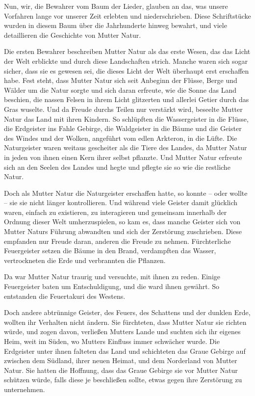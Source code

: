\trennzeichen

Nun, wir, die Bewahrer vom Baum der Lieder, glauben an das, was unsere Vorfahren lange vor unserer Zeit erlebten und niederschrieben. Diese Schriftstücke wurden in diesem Baum über die Jahrhunderte hinweg bewahrt, und viele detaillieren die Geschichte von Mutter Natur.

Die ersten Bewahrer beschreiben Mutter Natur als das erste Wesen, das das Licht der Welt erblickte und durch diese Landschaften strich. Manche waren sich sogar sicher, dass sie es gewesen sei, die dieses Licht der Welt überhaupt erst erschaffen habe. Fest steht, dass Mutter Natur sich seit Anbeginn der Flüsse, Berge und Wälder um die Natur sorgte und sich daran erfreute, wie die Sonne das Land beschien, die nassen Felsen in ihrem Licht glitzerten und allerlei Getier durch das Gras wuselte. Und da Freude durchs Teilen nur verstärkt wird, beseelte Mutter Natur das Land mit ihren Kindern. So schlüpften die Wassergeister in die Flüsse, die Erdgeister ins Fahle Gebirge, die Waldgeister in die Bäume und die Geister des Windes und der Wolken, angeführt vom edlen Arkteron, in die Lüfte. Die Naturgeister waren weitaus gescheiter als die Tiere des Landes, da Mutter Natur in jeden von ihnen einen Kern ihrer selbst pflanzte. Und Mutter Natur erfreute sich an den Seelen des Landes und hegte und pflegte sie so wie die restliche Natur.

Doch als Mutter Natur die Naturgeister erschaffen hatte, so konnte – oder wollte – sie sie nicht länger kontrollieren. Und während viele Geister damit glücklich waren, einfach zu existieren, zu interagieren und gemeinsam innerhalb der Ordnung dieser Welt umherzuspielen, so kam es, dass manche Geister sich von Mutter Naturs Führung abwandten und sich der Zerstörung zuschrieben. Diese empfanden nur Freude daran, anderen die Freude zu nehmen. Fürchterliche Feuergeister setzen die Bäume in den Brand, verdampften das Wasser, vertrockneten die Erde und verbrannten die Pflanzen.

Da war Mutter Natur traurig und versuchte, mit ihnen zu reden. Einige Feuergeister baten um Entschuldigung, und die ward ihnen gewährt. So entstanden die Feuertakuri des Westens.

Doch andere abtrünnige Geister, des Feuers, des Schattens und der dunklen Erde, wollten ihr Verhalten nicht ändern. Sie fürchteten, dass Mutter Natur sie richten würde, und zogen davon, verließen Mutters Lande und suchten sich ihr eigenes Heim, weit im Süden, wo Mutters Einfluss immer schwächer wurde. Die Erdgeister unter ihnen falteten das Land und schichteten das Graue Gebirge auf zwischen dem Südland, ihrer neuen Heimat, und dem Norderland von Mutter Natur. Sie hatten die Hoffnung, dass das Graue Gebirge sie vor Mutter Natur schützen würde, falls diese je beschließen sollte, etwas gegen ihre Zerstörung zu unternehmen.

